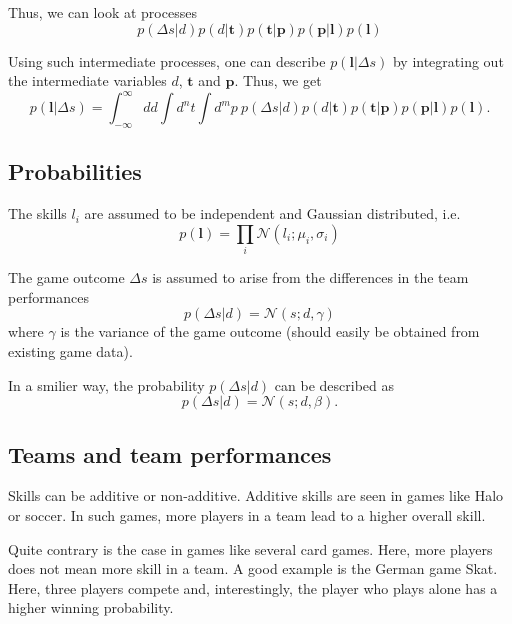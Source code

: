 \documentclass{article}
\begin{document}
Thus, we can look at processes
\begin{equation}
p(\Delta s | d) p(d | \mathbf{t} ) p(\mathbf{t} | \mathbf{p} ) p(\mathbf{p} | \mathbf{l}) p(\mathbf{l})
\end{equation}

Using such intermediate processes, one can describe $p(\mathbf{l} | \Delta s)$ by integrating out the intermediate variables $d$, $\mathbf{t}$ and $\mathbf{p}$. Thus, we get
\begin{equation}
p(\mathbf{l} | \Delta s) = \int_{-\infty}^{\infty} dd \int d^n t \int d^mp~ p(\Delta s | d) p(d | \mathbf{t} ) p(\mathbf{t} | \mathbf{p} ) p(\mathbf{p} | \mathbf{l}) p(\mathbf{l}).
\end{equation}


\subsection{Probabilities}

The skills $l_i$ are assumed to be independent and Gaussian distributed, i.e.
\begin{equation}
p(\mathbf{l}) = \prod_i \mathcal{N}(l_i;\mu_i,\sigma_i)
\end{equation}

The game outcome $\Delta s$ is assumed to arise from the differences in the team performances 
\begin{equation}
p(\Delta s | d ) = \mathcal{N}(s; d, \gamma)
\end{equation}
where $\gamma$ is the variance of the game outcome (should easily be obtained from existing game data). 

In a smilier way, the probability $p(\Delta s | d )$ can be described as 
\begin{equation}
p(\Delta s | d ) = \mathcal{N}(s; d, \beta).
\end{equation}




\subsection{Teams and team performances}

Skills can be additive or non-additive. Additive skills are seen in games like Halo or soccer. In such games, more players in a team lead to a higher overall skill.

Quite contrary is the case in games like several card games. Here, more players does not mean more skill in a team. A good example is the German game Skat. Here, three players compete and, interestingly, the player who plays alone has a higher winning probability. 
\end{document}
